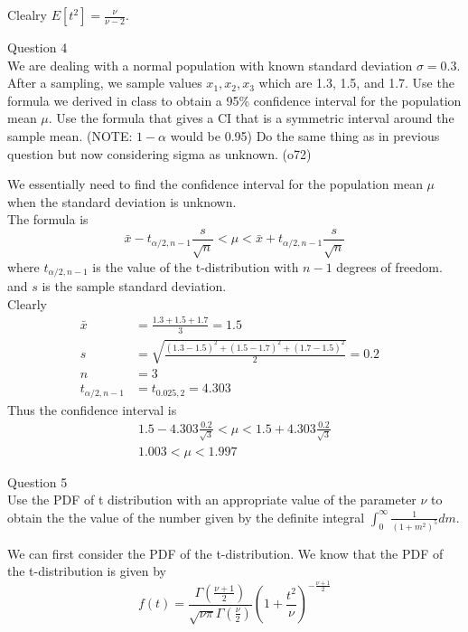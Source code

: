 \documentclass[answers,12pt,addpoints]{exam}
\begin{document}
\begin{questions}
\begin{solution}
        Clealry $E[t^2] = \frac{\nu}{\nu - 2}$.
    \end{solution}
    \question Question 4\\
    We are dealing with a normal population with known standard deviation \(\sigma = 0.3\). After a sampling, we sample values \(x_1, x_2, x_3\) which are 1.3, 1.5, and 1.7. Use the formula we derived in class to obtain a 95\% confidence interval for the population mean \(\mu\). Use the formula that gives a CI that is a symmetric interval around the sample mean. (NOTE: \(1 - \alpha\) would be 0.95)
    Do the same thing as in previous question but now considering sigma as unknown. (o72)
    \begin{solution}
        We essentially need to find the confidence interval for the population mean \(\mu\) when the standard deviation is unknown. \\
        The formula is 
        $$ \bar{x} - t_{\alpha/2, n-1} \frac{s}{\sqrt{n}} < \mu < \bar{x} + t_{\alpha/2, n-1} \frac{s}{\sqrt{n}}$$
        where \(t_{\alpha/2, n-1}\) is the value of the t-distribution with \(n-1\) degrees of freedom. and \(s\) is the sample standard deviation.\\
        Clearly 
        \begin{align*}
            \bar{x} &= \frac{1.3 + 1.5 + 1.7}{3} = 1.5\\
            s &= \sqrt{\frac{(1.3 - 1.5)^2 + (1.5 - 1.7)^2 + (1.7 - 1.5)^2}{2}} = 0.2\\
            n &=3 \\
            t_{\alpha/2, n-1} &= t_{0.025, 2} = 4.303&
        \end{align*}
        Thus the confidence interval is
        \begin{align*}
            1.5 - 4.303 \frac{0.2}{\sqrt{3}} < \mu < 1.5 + 4.303 \frac{0.2}{\sqrt{3}}\\
            1.003 < \mu < 1.997
        \end{align*}
    \end{solution}
    \question Question 5\\
    Use the PDF of t distribution with an appropriate value of the parameter \( \nu \) to obtain the the value of the number given by the definite integral $\int_0^\infty \frac{1}{(1+m^2)^{5}}dm$.\\
    \begin{solution}
        We can first consider the PDF of the t-distribution. We know that the PDF of the t-distribution is given by
        \[ f(t) = \frac{\Gamma \left(  \frac{\nu +1}{2} \right)}{\sqrt{\nu \pi} \Gamma\left( \frac{\nu}{2} \right)} \left(1 + \frac{t^2}{\nu}\right)^{-\frac{\nu +1}{2}} \]

\end{solution}
\end{questions}
\end{document}
